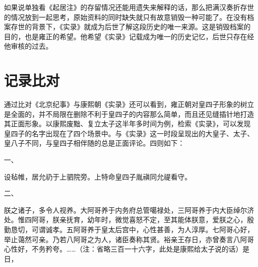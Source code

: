 
如果说单独看《起居注》的存留情况还能用遗失来解释的话，那么把满汉奏折存世的情况放到一起思考，原始资料的同时缺失就只有故意销毁一种可能了。在没有档案存世的背景下，《实录》就成为后世了解这段历史的唯一来源。这是销毁档案的目的，也是雍正的希望。他希望《实录》记载成为唯一的历史记忆，后世只存在经他审核的过去。


\begin{sectionnotes}



\end{sectionnotes}
\section{记录比对}


通过比对《北京纪事》与康熙朝《实录》还可以看到，雍正朝对皇四子形象的树立是全面的，并不局限在删除不利于皇四子的内容那么简单，而且还见缝插针地打造其正面形象。以康熙废黜、复立太子这半年多时间为例，检索《实录》，可以发现皇四子的名字出现在了四个场景中。与《实录》这一时段呈现出的大皇子、太子、皇八子不同，与皇四子相伴随的总是正面评论。四则如下：



\begin{bookquote}一、\par
设毡帷，居允礽于上驷院旁。上特命皇四子胤禛同允禔看守。\end{bookquote}


\begin{bookquote}二、\par
朕之诸子，多令人视养。大阿哥养于内务府总管噶禄处，三阿哥养于内大臣绰尔济处。惟四阿哥，朕亲抚育，幼年时，微觉喜怒不定，至其能体朕意，爱朕之心，殷勤恳切，可谓诚孝。五阿哥养于皇太后宫中，心性甚善，为人淳厚。七阿哥心好，举止蔼然可亲。乃若八阿哥之为人，诸臣奏称其贤。裕亲王存日，亦曾奏言八阿哥心性好，不务矜夸。……（注：省略三百一十六字，此处是康熙给太子说的话）是日，\end{bookquote}

